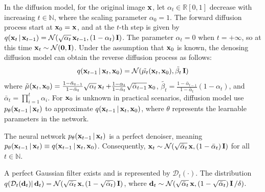 \documentclass[10pt,twocolumn,letterpaper]{article}
\begin{document}
In the diffusion model\cite{DBLP:conf/nips/HoJA20, DBLP:conf/iclr/SongME21}, for the original image $\operatorname{\mathbf{x}}$, let $\alpha_t\in \mathbb{R}[0, 1]$ decrease with increasing $t\in\mathbb{N}$, where the scaling parameter $\alpha_0=1$. The forward diffusion process start at $\operatorname{\mathbf{x}}_0 = \operatorname{\mathbf{x}}$, and at the $t$-th step is given by $q(\operatorname{\mathbf{x}}_t | \operatorname{\mathbf{x}}_{t-1}) = \mathcal{N} (\sqrt{\alpha_t} \operatorname{\mathbf{x}}_{t-1}, (1-\alpha_t)\operatorname{\mathbf{I}})$. The parameter $\alpha_t=0$ when $t = +\infty$, so at this time $\operatorname{\mathbf{x}}_t\sim \mathcal{N}(\mathbf{0}, \operatorname{\mathbf{I}})$. Under the assumption that $\operatorname{\mathbf{x}}_0$ is known, the denosing diffusion model can obtain the reverse diffusion process as follows:
\begin{equation}
	q(\operatorname{\mathbf{x}}_{t-1}|\operatorname{\mathbf{x}}_t,\operatorname{\mathbf{x}}_0) = \mathcal{N}(\tilde{\mu_t}(\operatorname{\mathbf{x}}_t,\operatorname{\mathbf{x}}_0),\tilde{\beta_t}\operatorname{\mathbf{I}})
\end{equation}
where $\tilde{\mu}(\operatorname{\mathbf{x}}_t,\operatorname{\mathbf{x}}_0) = \frac{1-\bar{\alpha}_{t-1}}{1-\bar{\alpha}_t}\sqrt{\alpha_t}\operatorname{\mathbf{x}}_t+\frac{1-\alpha_t}{1-\bar{\alpha}_t}\sqrt{\bar{\alpha}_{t-1}}\operatorname{\mathbf{x}}_0$, $\tilde{\beta_t}=\frac{1-\bar{\alpha}_{t-1}}{1-\bar{\alpha}_t}(1 - \alpha_t)$, and $\bar{\alpha}_t = \prod_{i=1}^{t}\alpha_i$. For $\operatorname{\mathbf{x}}_0$ is unknown  in practical scenarios, diffusion model use $p_\theta(\operatorname{\mathbf{x}}_{t-1}|\operatorname{\mathbf{x}}_t)$ to approximate $q(\operatorname{\mathbf{x}}_{t-1}|\operatorname{\mathbf{x}}_t,\operatorname{\mathbf{x}}_0)$, where $\theta$ represents the learnable parameters in the network.

\begin{assumption} \label{assum:ideal_diffusion}
	The neural network $p_\theta(\operatorname{\mathbf{x}}_{t-1}|\operatorname{\mathbf{x}}_t)$ is a perfect denoiser, meaning $p_\theta(\operatorname{\mathbf{x}}_{t-1}|\operatorname{\mathbf{x}}_t) \equiv q(\operatorname{\mathbf{x}}_{t-1}|\operatorname{\mathbf{x}}_t,\operatorname{\mathbf{x}}_0)$. Consequently, $\operatorname{\mathbf{x}}_t \sim\mathcal{N} (\sqrt{\bar{\alpha}_t} \operatorname{\mathbf{x}}, (1-\bar{\alpha}_t)\operatorname{\mathbf{I}})$ for all $t\in\mathbb{N}$.
\end{assumption}
\begin{assumption} \label{assum:ideal_filter}
	A perfect Gaussian filter exists and is represented by $\mathcal{D}_t(\cdot)$. The distribution $q(\mathcal{D}_t( \operatorname{\mathbf{d}}_t ) | \operatorname{\mathbf{d}}_t) = \mathcal{N}(\sqrt{\bar{\alpha}_t}\operatorname{\mathbf{x}}, (1-\sqrt{\bar{\alpha}_t})\operatorname{\mathbf{I}})$, where $\operatorname{\mathbf{d}}_t\sim \mathcal{N}(\sqrt{\bar{\alpha}_t}\operatorname{\mathbf{x}}, (1-\sqrt{\bar{\alpha}_t})\operatorname{\mathbf{I}}/\delta)$.
\end{assumption}
\end{document}
